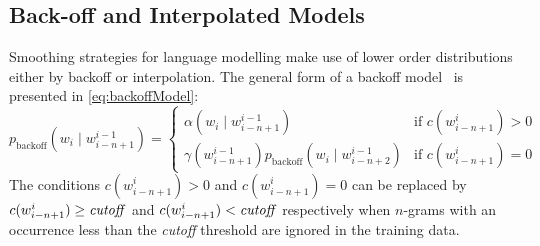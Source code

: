 \subsection{Back-off and Interpolated Models}
\label{sec:backoffAndInterpolatedModels}


Smoothing strategies for language modelling make use of lower order
distributions either by backoff or interpolation. The general form of a backoff
model~\citep{chen-goodman:1998:harvard} is presented in \autoref{eq:backoffModel}:
%
\begin{equation}
  p_{\text{backoff}}(w_i \mid w_{i - n + 1}^{i - 1}) =
  \begin{cases}
    \alpha(w_i \mid w_{i - n + 1}^{i - 1}) & \text{if } c(w_{i - n + 1}^i) > 0 \\
    \gamma(w_{i - n + 1}^{i - 1}) p_{\text{backoff}}(w_i \mid w_{i - n + 2}^{i - 1}) & \text{if } c(w_{i - n + 1}^i) = 0
  \end{cases}
  \label{eq:backoffModel}
\end{equation}
%
The conditions $c(w_{i - n + 1}^i) > 0$ and $c(w_{i - n + 1}^i) = 0$
can be replaced by $c(w_{i - n + 1}^i) \geq \text{\emph{cutoff}}$ and
$c(w_{i - n + 1}^i) < \text{\emph{cutoff}}$ respectively when $n$-grams with
an occurrence less than the \emph{cutoff} threshold are ignored
in the training data.

